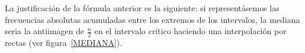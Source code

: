 \documentclass[12pt]{report}
\begin{document}
La justificación de la fórmula anterior es la siguiente: si representásemos las
frecuencias absolutas acumuladas entre los extremos de los intervalos, la mediana seria
la antiimagen de $\frac{n}{2}$ en  el intervalo crítico haciendo una interpolación por
rectas (ver figura~\ref{MEDIANA}).

\begin{figure}
\begin{center}

\end{center}
\end{figure}
\end{document}

